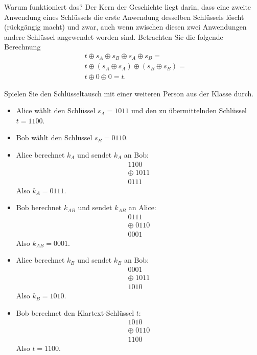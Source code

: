 \noindent
Warum funktioniert das? Der Kern der Geschichte liegt darin, dass eine zweite Anwendung eines Schlüssels die erste Anwendung desselben Schlüssels löscht (rückgängig macht) und
zwar, auch wenn zwischen diesen zwei Anwendungen andere Schlüssel angewendet worden sind. Betrachten Sie die folgende Berechnung
\begin{align*}
	 & t\oplus s_A \oplus s_B\oplus s_A\oplus s_B =    \\
	 & t\oplus (s_A\oplus s_A)\oplus (s_B\oplus s_B) = \\
	 & t\oplus 0\oplus 0 = t.
\end{align*}

\begin{myexercise}
	Spielen Sie den Schlüsseltausch mit einer weiteren Person aus der Klasse durch.
	\begin{myanswer}
		\begin{itemize}
			\item Alice wählt den Schlüssel $s_A = 1011$ und den zu übermittelnden Schlüssel $t = 1100$.
			\item Bob wählt den Schlüssel $s_B = 0110$.
			\item Alice berechnet $k_A$ und sendet $k_A$ an Bob:
			\[
			\begin{array}{r}
			1100\\
			\oplus\;1011\\
			\hline
			0111
			\end{array}
			\]
			Also $k_A = 0111$.
			\item Bob berechnet $k_{AB}$ und sendet $k_{AB}$ an Alice:
			\[
			\begin{array}{r}
			0111\\
			\oplus\;0110\\
			\hline
			0001
			\end{array}
			\]
			Also $k_{AB} = 0001$.
			\item Alice berechnet $k_B$ und sendet $k_B$ an Bob:
			\[
			\begin{array}{r}
			0001\\
			\oplus\;1011\\
			\hline
			1010
			\end{array}
			\]
			Also $k_B = 1010$.
			\item Bob berechnet den Klartext-Schlüssel $t$:
			\[
			\begin{array}{r}
			1010\\
			\oplus\;0110\\
			\hline
			1100
			\end{array}
			\]
			Also $t = 1100$.
		\end{itemize}
	\end{myanswer}
\end{myexercise}


